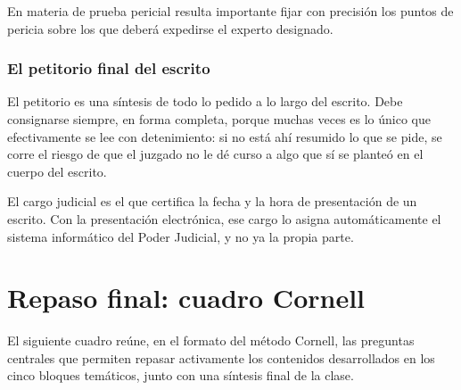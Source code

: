 \documentclass[12pt,oneside]{book}
\begin{document}
En materia de prueba pericial resulta importante fijar con precisión los puntos de pericia sobre los que deberá expedirse el experto designado.

\subsection*{El petitorio final del escrito}

El petitorio es una síntesis de todo lo pedido a lo largo del escrito. Debe consignarse siempre, en forma completa, porque muchas veces es lo único que efectivamente se lee con detenimiento: si no está ahí resumido lo que se pide, se corre el riesgo de que el juzgado no le dé curso a algo que sí se planteó en el cuerpo del escrito.

\begin{note}
El cargo judicial es el que certifica la fecha y la hora de presentación de un escrito. Con la presentación electrónica, ese cargo lo asigna automáticamente el sistema informático del Poder Judicial, y no ya la propia parte.
\end{note}

\chapter{Repaso final: cuadro Cornell}

El siguiente cuadro reúne, en el formato del método Cornell, las preguntas centrales que permiten repasar activamente los contenidos desarrollados en los cinco bloques temáticos, junto con una síntesis final de la clase.
\end{document}
